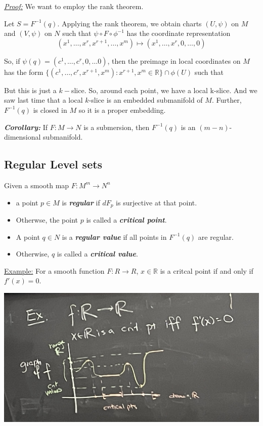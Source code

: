 \documentclass{article}
\newcommand{\R}{\mathbb{R}}
\begin{document}
\vskip 0.5cm
\underline{\emph{Proof:}} We want to employ the rank theorem.

\vskip 0.5cm
Let $S = F^{-1}(q)$. Applying the rank theorem, we obtain charts $(U, \psi)$ on $M$ and $(V, \psi)$ on $N$ such that $\psi \circ F \circ \phi^{-1}$ has the coordinate representation 
\[ (x^1, \dots, x^r, x^{r+1}, \dots, x^{m}) \mapsto (x^1, \dots, x^r, 0, \dots, 0)  \]

So, if $\psi(q) = (c^1, \dots, c^r, 0, \dots 0)$, then the preimage in local coordinates on $M$ has the form $\{(c^1, \dots, c^r, x^{r+1}, x^{m}) :  x^{r+1}, x^{m} \in \R \} \cap \phi(U)$ such that 

But this is just a $k-$slice. So, around each point, we have a local k-slice. And we saw last time that a local $k$-slice is an embedded submanifold of $M$. Further, $F^{-1}(q)$ is closed in $M$ so it is a proper embedding.

\vskip 0.5cm
\begin{dottedbox}
  \emph{\textbf{Corollary:}} If $F: M \rightarrow N$ is a submersion, then $F^{-1}(q)$ is an $(m-n)$-dimensional submanifold.
\end{dottedbox}

\vskip 0.5cm
\subsection*{Regular Level sets}

\begin{mathdefinitionbox}{}
  Given a smooth map $F : M^m \rightarrow N^n$
  \begin{itemize}
    \item a point $p \in M$ is \emph{\textbf{regular}} if $dF_p$ is surjective at that point.
    \item Otherwse, the point $p$ is called a \emph{\textbf{critical point}}.
    \item A point $q \in N$ is a \emph{\textbf{regular value}} if all points in $F^{-1}(q)$ are regular.
    \item Otherwise, $q$ is called a \emph{\textbf{critical value}}.
  \end{itemize}
\end{mathdefinitionbox}

\vskip 0.5cm
\underline{Example:} For a smooth function $F : R \rightarrow R$, $x \in \R$ is a critcal point if and only if $f'(x) = 0$.

\vskip 0.5cm
\begin{center}
  \includegraphics*[scale=0.05]{critical points example.png}
\end{center}
\end{document}
